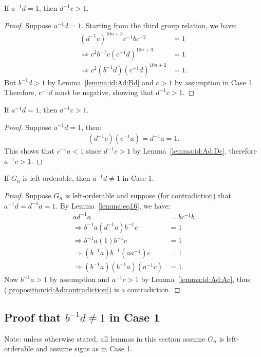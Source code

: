 \begin{lemma} If $a^{-1}d=1$, then $d^{-1}c>1$.
\label{lemma:id:Ad:Dc}
\end{lemma}
\begin{proof} Suppose $a^{-1}d=1$. Starting from the third group relation, we have:
\begin{align*}
(d^{-1}c)^{10n+3}c^{-1}bc^{-2}&=1\\
\Rightarrow{}c^{2}b^{-1}c(c^{-1}d)^{10n+3}&=1\\
\Rightarrow{}c^{2}(b^{-1}d)(c^{-1}d)^{10n+2}&=1.
\end{align*}
But $b^{-1}d>1$ by Lemma~\ref{lemma:id:Ad:Bd} and $c>1$ by assumption in Case 1. Therefore, $c^{-1}d$ must be negative, showing that $d^{-1}c>1$.
\end{proof}

\begin{lemma} If $a^{-1}d=1$, then $a^{-1}c>1$.
\label{lemma:id:Ad:Ac}
\end{lemma}
\begin{proof} Suppose $a^{-1}d=1$, then:
\begin{align*}
(d^{-1}c)(c^{-1}a)=d^{-1}a=1.
\end{align*}
This shows that $c^{-1}a<1$ since $d^{-1}c>1$ by Lemma~\ref{lemma:id:Ad:Dc}, therefore $a^{-1}c>1$.
\end{proof}

\begin{proposition} If $G_n$ is left-orderable, then $a^{-1}d\neq{}1$ in Case 1.
\label{proposition:id:Ad}
\label{proposition:id:dA}
\end{proposition}
\begin{proof} Suppose $G_n$ is left-orderable and suppose (for contradiction) that $a^{-1}d=d^{-1}a=1$. By Lemma~\ref{lemma:eq16}, we have:
\begin{align}
ad^{-1}a&=bc^{-1}b\nonumber{}\\
\Rightarrow{}b^{-1}a(d^{-1}a)b^{-1}c&=1\nonumber{}\\
\Rightarrow{}b^{-1}a(1)b^{-1}c&=1\\
\Rightarrow{}(b^{-1}a)b^{-1}(aa^{-1})c&=1\nonumber{}\\
\Rightarrow{}(b^{-1}a)(b^{-1}a)(a^{-1}c)&=1.\label{proposition:id:Ad:contradiction}
\end{align}
Now $b^{-1}a>1$ by assumption and $a^{-1}c>1$ by Lemma~\ref{lemma:id:Ad:Ac}, thus (\ref{proposition:id:Ad:contradiction}) is a contradiction.
\end{proof}

\subsection{Proof that $b^{-1}d\neq{}1$ in Case 1}
\noindent{}Note: unless otherwise stated, all lemmas in this section assume $G_n$ is left-orderable and assume signs as in Case 1.

